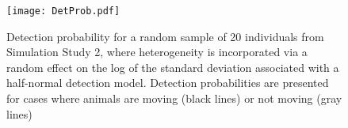 \documentclass[12pt,fleqn]{article}
\begin{document}
\pagebreak
\begin{figure}
\begin{center}
\texttt{[image: DetProb.pdf]}
\caption{Detection probability for a random sample of 20 individuals from Simulation Study 2, where heterogeneity is incorporated via a random effect on the log of the standard deviation associated with a half-normal detection model.  Detection probabilities are presented for cases where animals are moving (black lines) or not moving (gray lines)}
\label{fig:hn}
\end{center}
\end{figure}
\end{document}
